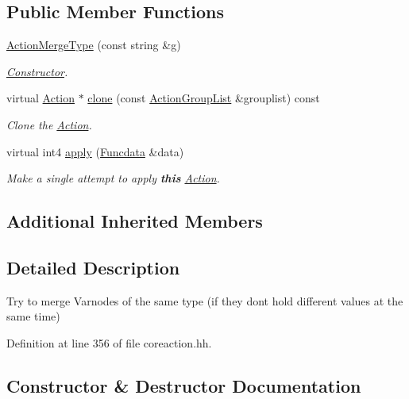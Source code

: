 \subsection*{Public Member Functions}
\begin{DoxyCompactItemize}
\item 
\mbox{\hyperlink{class_action_merge_type_a2513353a5f0d9d7d12a10c4091d496eb}{Action\+Merge\+Type}} (const string \&g)
\begin{DoxyCompactList}\small\item\em \mbox{\hyperlink{class_constructor}{Constructor}}. \end{DoxyCompactList}\item 
virtual \mbox{\hyperlink{class_action}{Action}} $\ast$ \mbox{\hyperlink{class_action_merge_type_a40066f8b61af9229a6527967c4de0ead}{clone}} (const \mbox{\hyperlink{class_action_group_list}{Action\+Group\+List}} \&grouplist) const
\begin{DoxyCompactList}\small\item\em Clone the \mbox{\hyperlink{class_action}{Action}}. \end{DoxyCompactList}\item 
virtual int4 \mbox{\hyperlink{class_action_merge_type_a512152b02f4dedd4d83fb0ddb4f9a990}{apply}} (\mbox{\hyperlink{class_funcdata}{Funcdata}} \&data)
\begin{DoxyCompactList}\small\item\em Make a single attempt to apply {\bfseries{this}} \mbox{\hyperlink{class_action}{Action}}. \end{DoxyCompactList}\end{DoxyCompactItemize}
\subsection*{Additional Inherited Members}


\subsection{Detailed Description}
Try to merge Varnodes of the same type (if they don\textquotesingle{}t hold different values at the same time) 

Definition at line 356 of file coreaction.\+hh.



\subsection{Constructor \& Destructor Documentation}
\mbox{\label{class_action_merge_type_a2513353a5f0d9d7d12a10c4091d496eb}} 

